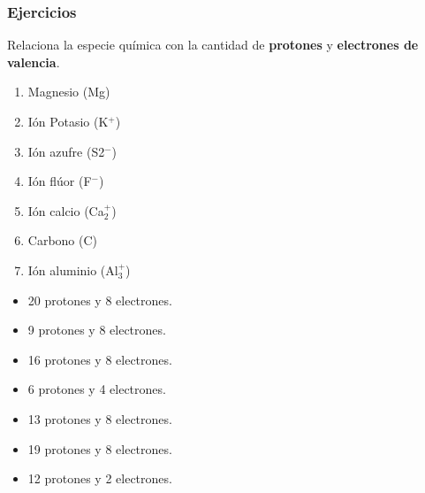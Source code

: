\subsubsection{Ejercicios}
\begin{boxK}
    Relaciona la especie química con la cantidad de \textbf{protones} y \textbf{electrones de valencia}.\\

    \begin{minipage}{0.5\textwidth}
        \begin{enumerate}
            \item Magnesio (Mg)
            \item I\'on Potasio (K$^+$)
            \item Ión azufre (S2$^-$)
            \item Ión flúor (F$^-$)
            \item Ión calcio (Ca$_2^+$)
            \item Carbono (C)
            \item Ión aluminio (Al$_3^+$)
        \end{enumerate}
    \end{minipage}%
    \begin{minipage}{0.5\textwidth}
        \begin{itemize}
            \item[\rule{1cm}{0.2mm}] 20 protones y 8 electrones.
            \item[\rule{1cm}{0.2mm}] 9 protones y 8 electrones.
            \item[\rule{1cm}{0.2mm}] 16 protones y 8 electrones.
            \item[\rule{1cm}{0.2mm}] 6 protones y 4 electrones.
            \item[\rule{1cm}{0.2mm}] 13 protones y 8 electrones.
            \item[\rule{1cm}{0.2mm}] 19 protones y 8 electrones.
            \item[\rule{1cm}{0.2mm}] 12 protones y 2 electrones.
        \end{itemize}
    \end{minipage}

\end{boxK}

